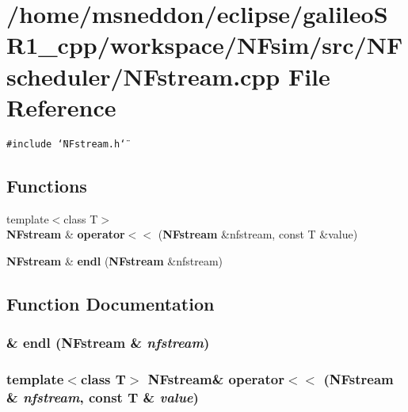 \section{/home/msneddon/eclipse/galileoSR1\_\-cpp/workspace/NFsim/src/NFscheduler/NFstream.cpp File Reference}
\label{NFstream_8cpp}


{\tt \#include \char`\"{}NFstream.h\char`\"{}}\par
\subsection*{Functions}
\begin{CompactItemize}
\item 
{\footnotesize template$<$class T$>$ }\\{\bf NFstream} \& {\bf operator$<$$<$} ({\bf NFstream} \&nfstream, const T \&value)
\item 
{\bf NFstream} \& {\bf endl} ({\bf NFstream} \&nfstream)
\end{CompactItemize}


\subsection{Function Documentation}
\subsubsection{\& endl ({\bf NFstream} \& {\em nfstream})}\label{NFstream_8cpp_70d95b404a0185199948bf778584bdc3}


\subsubsection{\setlength{\rightskip}{0pt plus 5cm}template$<$class T$>$ {\bf NFstream}\& operator$<$$<$ ({\bf NFstream} \& {\em nfstream}, const T \& {\em value})\hspace{0.3cm}{\tt  [inline]}}\label{NFstream_8cpp_ef588953052314e1b69285568a59947f}


